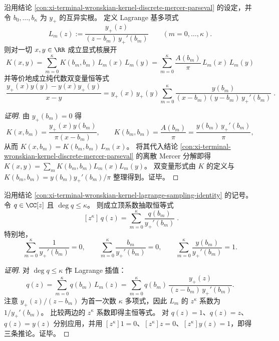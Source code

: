 \begin{conclusion}\label{con:xi-terminal-wronskian-kernel-lagrange-sampling-identity}
沿用结论 \ref{con:xi-terminal-wronskian-kernel-discrete-mercer-parseval} 的设定，并令 \(b_0,\dots,b_\kappa\) 为 \(y_{+}\) 的互异实根。
定义 Lagrange 基多项式
\[
L_m(z):=\frac{y_{+}(z)}{(z-b_m)\,y_{+}'(b_m)}\qquad (m=0,\dots,\kappa).
\]
则对一切 \(x,y\in\RR\) 成立显式核展开
\[
\boxed{\;
K(x,y)=\sum_{m=0}^{\kappa}K(b_m,b_m)\,L_m(x)\,L_m(y)
=\sum_{m=0}^{\kappa}\frac{A(b_m)}{\pi}\,L_m(x)\,L_m(y)\;}
\]
并等价地成立纯代数双变量恒等式
\[
\boxed{\;
\frac{y_{+}(x)y(y)-y(x)y_{+}(y)}{x-y}
=y_{+}(x)\,y_{+}(y)\sum_{m=0}^{\kappa}\frac{y(b_m)}{(x-b_m)(y-b_m)\,y_{+}'(b_m)}\; }.
\]
\end{conclusion}
\begin{proof}[证明]
由 \(y_{+}(b_m)=0\) 得
\[
K(x,b_m)=\frac{y_{+}(x)y(b_m)}{\pi(x-b_m)},
\qquad
K(b_m,b_m)=\frac{A(b_m)}{\pi}=\frac{y(b_m)\,y_{+}'(b_m)}{\pi},
\]
从而 \(K(x,b_m)=K(b_m,b_m)\,L_m(x)\)。
将其代入结论 \ref{con:xi-terminal-wronskian-kernel-discrete-mercer-parseval} 的离散 Mercer 分解即得
\(
K(x,y)=\sum_m K(b_m,b_m)L_m(x)L_m(y)
\)。
双变量形式由 \(K\) 的定义与 \(K(b_m,b_m)=y(b_m)y_{+}'(b_m)/\pi\) 整理得到。证毕。
\end{proof}

\begin{conclusion}\label{con:xi-terminal-wronskian-top-coefficient-extraction}
沿用结论 \ref{con:xi-terminal-wronskian-kernel-lagrange-sampling-identity} 的记号。
令 \(q\in\CC[z]\) 且 \(\deg q\le \kappa\)。
则成立顶系数抽取恒等式
\[
\boxed{\;[z^{\kappa}]\,q(z)=\sum_{m=0}^{\kappa}\frac{q(b_m)}{y_{+}'(b_m)}\; }.
\]
特别地，
\[
\sum_{m=0}^{\kappa}\frac{1}{y_{+}'(b_m)}=0,\qquad
\sum_{m=0}^{\kappa}\frac{b_m}{y_{+}'(b_m)}=0,\qquad
\sum_{m=0}^{\kappa}\frac{y(b_m)}{y_{+}'(b_m)}=1.
\]
\end{conclusion}
\begin{proof}[证明]
对 \(\deg q\le\kappa\) 作 Lagrange 插值：
\[
q(z)=\sum_{m=0}^{\kappa} q(b_m)\,L_m(z)
=\sum_{m=0}^{\kappa}q(b_m)\,\frac{y_{+}(z)}{(z-b_m)\,y_{+}'(b_m)}.
\]
注意 \(y_{+}(z)/(z-b_m)\) 为首一次数 \(\kappa\) 多项式，因此 \(L_m\) 的 \(z^\kappa\) 系数为 \(1/y_{+}'(b_m)\)。
比较两边的 \(z^\kappa\) 系数即得主恒等式。
对 \(q(z)=1\)、\(q(z)=z\)、\(q(z)=y(z)\) 分别应用，并用 \([z^\kappa]1=0\)、\([z^\kappa]z=0\)、\([z^\kappa]y(z)=1\)，即得三条推论。证毕。
\end{proof}

\endinput
